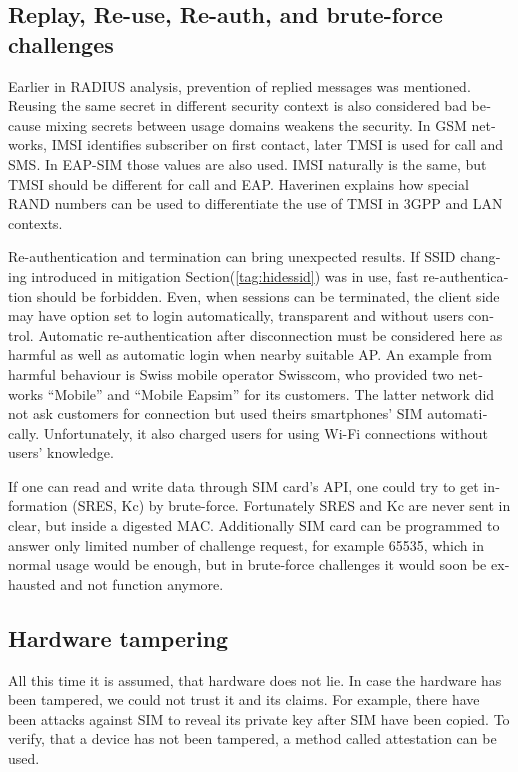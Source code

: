 \documentclass[12pt,a4paper,english]{tutthesis}
\begin{document}
\begin{otherlanguage}{english}
\subsection{Replay, Re-use, Re-auth, and brute-force challenges}
\label{sec-6-4-5}

Earlier in RADIUS analysis, prevention of replied messages was
mentioned. Reusing the same secret in different security context is also
considered bad because mixing secrets between usage
domains weakens the security.  In GSM networks, IMSI identifies subscriber on
first contact, later TMSI is used for call and SMS.  In EAP-SIM those
values are also used. IMSI naturally is the same, but TMSI should be
different for call and EAP.  Haverinen\cite{hav-doc} explains how
special RAND numbers can be used to differentiate the use of TMSI in 3GPP and LAN
contexts.

Re-authentication and termination can bring unexpected results.
If SSID changing introduced in mitigation Section(\ref{tag:hidessid}) was in use, fast re-authentication
should be forbidden\cite[p.11]{rfc5448}.
Even, when sessions can be terminated, the client side may have 
option set to login automatically, transparent and without users control.
Automatic re-authentication after disconnection  must be considered
here as harmful as well as automatic login when nearby suitable AP. An
example from harmful behaviour is Swiss mobile operator Swisscom, who
 provided two networks ``Mobile'' and ``Mobile Eapsim''  for its
customers. 
The latter network did not ask customers
for connection but used theirs smartphones' SIM automatically. Unfortunately,
it also charged users for using Wi-Fi connections without users'
knowledge.\cite{swisscom}



If one can read and write data through SIM card's API,
one could try to get information (SRES, Kc) by brute-force. 
Fortunately SRES and Kc are never sent in clear, but inside
a digested MAC.
 Additionally SIM card can be programmed to answer only
limited number of challenge request, for example 65535, which in
normal usage would be enough, but in brute-force challenges 
it would soon be exhausted and not function anymore.


\subsection{Hardware tampering}
\label{sec-6-4-6}
All this time it is assumed, that hardware does not lie. In case
the hardware has been tampered, we could not trust it and its claims.
For example, there have been attacks against SIM to reveal its private
key after SIM have been copied.  To verify, that a device has not been
tampered, a method called attestation can be used.


\end{otherlanguage}
\end{document}
